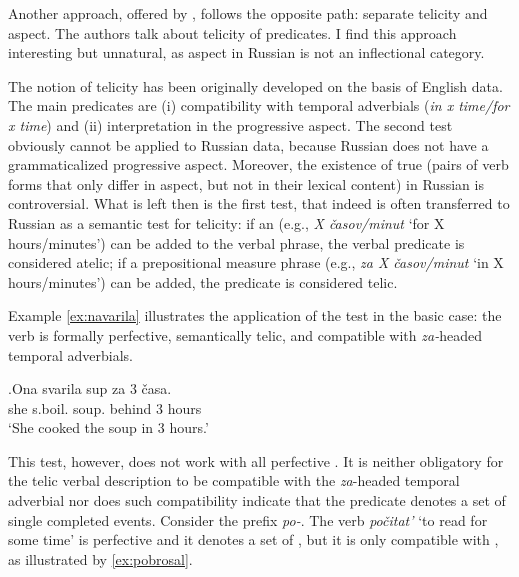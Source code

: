 Another approach, offered by \citet{PaduchevaPentus:08}, follows the opposite path: separate telicity and aspect. The authors talk about telicity of  predicates. I find this approach interesting but unnatural, as aspect in Russian is not an inflectional category. 

The notion of telicity has been originally developed on the basis of English data. The main  predicates are (i) compatibility with temporal adverbials (\textit{in x time/for x time}) and (ii) interpretation in the progressive aspect. The second test obviously cannot be applied to Russian data, because Russian does not have a grammaticalized progressive aspect. Moreover, the existence of true  (pairs of verb forms that only differ in aspect, but not in their lexical content) in Russian is controversial.
What is left then is the first test, that indeed is often transferred to Russian as a semantic test for telicity: if an  (e.g., \textit{X \v{c}asov/minut} `for X hours/minutes') can be added to the verbal phrase, the verbal predicate is considered atelic; if a prepositional measure phrase (e.g., \textit{za X \v{c}asov/minut} `in X hours/minutes') can be added, the predicate is considered telic.

Example \ref{ex:navarila} illustrates the application of the test in the basic case: the verb is formally perfective, semantically telic, and compatible with \textit{za-}headed temporal adverbials. 

\exg.\label{ex:navarila}Ona svarila\textsuperscript{\PF} sup za 3 \v{c}asa.\\
she s.boil. soup. behind 3 hours\\
\trans `She cooked the soup in 3 hours.'

This test, however, does not work with all perfective . It is neither obligatory for the telic verbal description to be compatible with the \textit{za}-headed temporal adverbial nor does such compatibility indicate that the predicate denotes a set of single completed events. Consider the prefix \textit{po-}. The verb \textit{po\v{c}itat'}\textsuperscript{\PF} `to read for some time' is perfective and it denotes a set of , but it is only compatible with , as illustrated by \ref{ex:pobrosal}.

